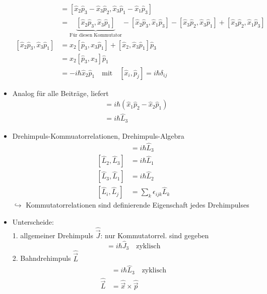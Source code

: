 \documentclass[10pt,article,colorback,accentcolor=tud9d]{scrartcl}
\begin{document}
\begin{itemize}
\begin{align}
      [\hat{L}_1,\hat{L}_2]&=[\hat{x}_2\hat{p}_3-\hat{x}_3\hat{p}_2,\hat{x}_3\hat{p}_1-\hat{x}_1\hat{p}_3]\\
      &=\underbrace{[\hat{x}_2\hat{p}_3,\hat{x}_3\hat{p}_1]}_{\text{Für diesen Kommutator}}-[\hat{x}_2\hat{p}_3,\hat{x}_1\hat{p}_3]-[\hat{x}_3\hat{p}_2,\hat{x}_3\hat{p}_1]+[\hat{x}_3\hat{p}_2,\hat{x}_1\hat{p}_3]\\
      [\hat{x}_2\hat{p}_3,\hat{x}_3\hat{p}_1]&=\hat{x}_2[\hat{p}_3,\hat{x}_3\hat{p}_1]+[\hat{x}_2,\hat{x}_3\hat{p}_1]\hat{p}_3\\
      &=\hat{x}_2[\hat{p}_3,\hat{x}_3]\hat{p}_1\\
      &=-i\hbar\hat{x}_2\hat{p}_1 \quad \text{mit}\quad [\hat{x}_i,\hat{p}_j]=i\hbar\delta_{ij}
    \end{align}
  \item Analog für alle Beiträge, liefert 
    \begin{align}
    [\hat{L}_1,\hat{L}_2]&=i\hbar(\hat{x}_1\hat{p}_2-\hat{x}_2\hat{p}_1)\\
    &=i\hbar\hat{L}_3
    \end{align}
  \item Drehimpuls-Kommuatorrelationen, Drehimpuls-Algebra
    \begin{align}
    [\hat{L}_1,\hat{L}_2]&=i\hbar\hat{L}_3\\
    [\hat{L}_2,\hat{L}_3]&=i\hbar\hat{L}_1\\
    [\hat{L}_3,\hat{L}_1]&=i\hbar\hat{L}_2\\
    [\hat{L}_i,\hat{L}_j]&=\sum_k\epsilon_{ijk}\hat{L}_k
    \end{align}
    $\hookrightarrow$ Kommutatorrelationen sind definierende Eigenschaft jedes Drehimpulses
  \item Unterscheide:\\
    1. allgemeiner Drehimpuls $\hat{\vec{J}}$: nur Kommutatorrel. sind gegeben
    \begin{equation}
    [\hat{J}_1,\hat{J}_2]=i\hbar\hat{J}_3 \quad \text{zyklisch}
    \end{equation}
    2. Bahndrehimpuls $\hat{\vec{L}}$
    \begin{align}
    [\hat{L}_1,\hat{L}_2]&=i\hbar\hat{L}_3 \quad \text{zyklisch}\\
    \hat{\vec{L}}&=\hat{\vec{x}}\times\hat{\vec{p}}
    \end{align}
\end{itemize}
\end{document}
